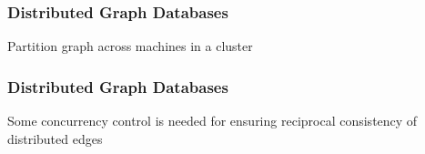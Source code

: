 \begin{frame}
  \frametitle{Distributed Graph Databases}
  \centering
  Partition graph across machines in a cluster
  

\end{frame}

\begin{frame}
  \frametitle{Distributed Graph Databases}
  Some concurrency control is needed for ensuring reciprocal consistency of distributed edges
\end{frame}